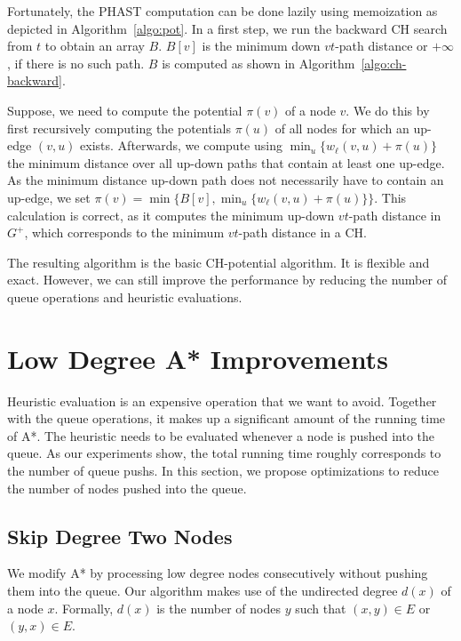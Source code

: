 \documentclass[letterpaper]{article} %
\begin{document}
Fortunately, the PHAST computation can be done lazily using memoization as depicted in Algorithm~\ref{algo:pot}.
In a first step, we run the backward CH search from $t$ to obtain an array $B$.
$B[v]$ is the minimum down $vt$-path distance or $+\infty$, if there is no such path.
$B$ is computed as shown in Algorithm~\ref{algo:ch-backward}.

Suppose, we need to compute the potential $\pi(v)$ of a node $v$.
We do this by first recursively computing the potentials $\pi(u)$ of all nodes for which an up-edge $(v,u)$ exists.
Afterwards, we compute using $\min_u\{w_\ell(v,u) + \pi(u)\}$ the minimum distance over all up-down paths that contain at least one up-edge.
As the minimum distance up-down path does not necessarily have to contain an up-edge, we set $\pi(v) = \min \{ B[v], \min_u\{w_\ell(v,u) + \pi(u)\} \}$.
This calculation is correct, as it computes the minimum up-down $vt$-path distance in $G^+$, which corresponds to the minimum $vt$-path distance in a CH.

The resulting algorithm is the basic CH-potential algorithm.
It is flexible and exact.
However, we can still improve the performance by reducing the number of queue operations and heuristic evaluations.

\section{Low Degree A* Improvements}

\label{sec:low-deg-improvment}

Heuristic evaluation is an expensive operation that we want to avoid.
Together with the queue operations, it makes up a significant amount of the running time of A*.
The heuristic needs to be evaluated whenever a node is pushed into the queue.
As our experiments show, the total running time roughly corresponds to the number of queue pushs.
In this section, we propose optimizations to reduce the number of nodes pushed into the queue.

\subsection{Skip Degree Two Nodes}

We modify A* by processing low degree nodes consecutively without pushing them into the queue.
Our algorithm makes use of the undirected degree $d(x)$ of a node $x$.
Formally, $d(x)$ is the number of nodes $y$ such that $(x,y)\in E$ or $(y,x)\in E$.
\end{document}
